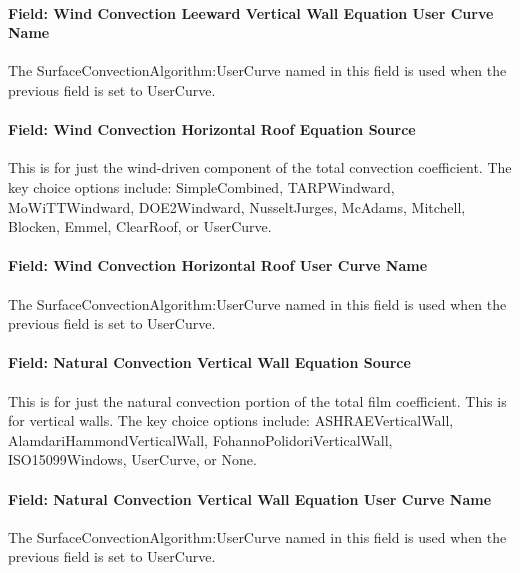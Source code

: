 \paragraph{Field: Wind Convection Leeward Vertical Wall Equation User Curve Name}\label{field-wind-convection-leeward-vertical-wall-equation-user-curve-name}

The SurfaceConvectionAlgorithm:UserCurve named in this field is used when the previous field is set to UserCurve.

\paragraph{Field: Wind Convection Horizontal Roof Equation Source}\label{field-wind-convection-horizontal-roof-equation-source}

This is for just the wind-driven component of the total convection coefficient. The key choice options include: SimpleCombined, TARPWindward, MoWiTTWindward, DOE2Windward, NusseltJurges, McAdams, Mitchell, Blocken, Emmel, ClearRoof, or UserCurve.

\paragraph{Field: Wind Convection Horizontal Roof User Curve Name}\label{field-wind-convection-horizontal-roof-user-curve-name}

The SurfaceConvectionAlgorithm:UserCurve named in this field is used when the previous field is set to UserCurve.

\paragraph{Field: Natural Convection Vertical Wall Equation Source}\label{field-natural-convection-vertical-wall-equation-source}

This is for just the natural convection portion of the total film coefficient. This is for vertical walls. The key choice options include: ASHRAEVerticalWall, AlamdariHammondVerticalWall, FohannoPolidoriVerticalWall, ISO15099Windows, UserCurve, or None.

\paragraph{Field: Natural Convection Vertical Wall Equation User Curve Name}\label{field-natural-convection-vertical-wall-equation-user-curve-name}

The SurfaceConvectionAlgorithm:UserCurve named in this field is used when the previous field is set to UserCurve.

